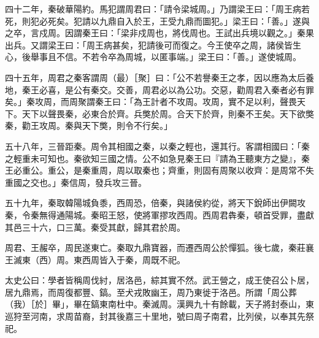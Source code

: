 \begin{pinyinscope}
四十二年，秦破華陽約。馬犯謂周君曰：「請令梁城周。」乃謂梁王曰：「周王病若死，則犯必死矣。犯請以九鼎自入於王，王受九鼎而圖犯。」梁王曰：「善。」遂與之卒，言戍周。因謂秦王曰：「梁非戍周也，將伐周也。王試出兵境以觀之。」秦果出兵。又謂梁王曰：「周王病甚矣，犯請後可而復之。今王使卒之周，諸侯皆生心，後舉事且不信。不若令卒為周城，以匿事端。」梁王曰：「善。」遂使城周。

四十五年，周君之秦客謂周（最）［聚］曰：「公不若譽秦王之孝，因以應為太后養地，秦王必喜，是公有秦交。交善，周君必以為公功。交惡，勸周君入秦者必有罪矣。」秦攻周，而周聚謂秦王曰：「為王計者不攻周。攻周，實不足以利，聲畏天下。天下以聲畏秦，必東合於齊。兵獘於周。合天下於齊，則秦不王矣。天下欲獘秦，勸王攻周。秦與天下獘，則令不行矣。」

五十八年，三晉距秦。周令其相國之秦，以秦之輕也，還其行。客謂相國曰：「秦之輕重未可知也。秦欲知三國之情。公不如急見秦王曰『請為王聽東方之變』，秦王必重公。重公，是秦重周，周以取秦也；齊重，則固有周聚以收齊：是周常不失重國之交也。」秦信周，發兵攻三晉。

五十九年，秦取韓陽城負黍，西周恐，倍秦，與諸侯約從，將天下銳師出伊闕攻秦，令秦無得通陽城。秦昭王怒，使將軍摎攻西周。西周君犇秦，頓首受罪，盡獻其邑三十六，口三萬。秦受其獻，歸其君於周。

周君、王赧卒，周民遂東亡。秦取九鼎寶器，而遷西周公於憚狐。後七歲，秦莊襄王滅東（西）周。東西周皆入于秦，周既不祀。

太史公曰：學者皆稱周伐紂，居洛邑，綜其實不然。武王營之，成王使召公卜居，居九鼎焉，而周復都豐、鎬。至犬戎敗幽王，周乃東徙于洛邑。所謂「周公葬（我）［於］畢」，畢在鎬東南杜中。秦滅周。漢興九十有餘載，天子將封泰山，東巡狩至河南，求周苗裔，封其後嘉三十里地，號曰周子南君，比列侯，以奉其先祭祀。


\end{pinyinscope}